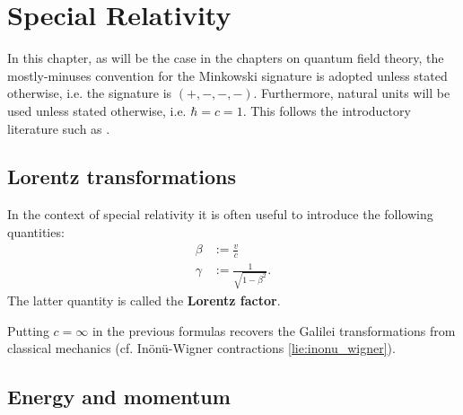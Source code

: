 \chapter{Special Relativity}

    In this chapter, as will be the case in the chapters on quantum field theory, the mostly-minuses convention for the Minkowski signature is adopted unless stated otherwise, i.e. the signature is $(+,-,-,-)$. Furthermore, natural units will be used unless stated otherwise, i.e. $\hbar = c = 1$. This follows the introductory literature such as \cite{Peskin, greiner_qft}.

\section{Lorentz transformations}

    \begin{notation}
        In the context of special relativity it is often useful to introduce the following quantities:
        \begin{align}
            \beta &:= \frac{v}{c}\\
            \label{relativity:lorentz_factor}
            \gamma &:= \frac{1}{\sqrt{1 - \beta^2}}.
        \end{align}
        The latter quantity is called the \textbf{Lorentz factor}.
    \end{notation}
    \begin{remark}
        Putting $c=\infty$ in the previous formulas recovers the Galilei transformations from classical mechanics (cf. In\"on\"u-Wigner contractions \ref{lie:inonu_wigner}).
    \end{remark}

\section{Energy and momentum}

